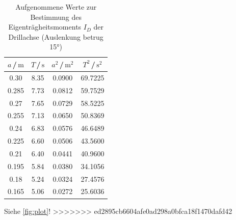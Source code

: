 \begin{table}[H]
\normalsize

\centering
{}
\begin{tabular}{c c c c}
\toprule
    $a$\,/\,$\si{\meter}$ &  $T$\,/\,$\si{\second}$ & $a^2$\,/\,$\si{\meter}^2$ &  $T^2$\,/\,$\si{\second}^2$ \\
    \midrule

0.30  &   8.35 &  0.0900      & 69.7225\\
0.285 &   7.73 &  0.0812  & 59.7529\\
0.27  &   7.65 &  0.0729    & 58.5225\\
0.255 &   7.13 &  0.0650  & 50.8369\\
0.24  &   6.83 &  0.0576    & 46.6489\\
0.225 &   6.60 &  0.0506  & 43.5600\\
0.21  &   6.40 &  0.0441    & 40.9600\\
0.195 &   5.84 &  0.0380  & 34.1056\\
0.18  &   5.24 &  0.0324    & 27.4576\\
0.165 &   5.06 &  0.0272  & 25.6036\\ 

    \bottomrule
\end{tabular}
\caption{Aufgenommene Werte zur Bestimmung des Eigenträgheitsmoments $I_{D}$ der Drillachse (Auslenkung betrug 15°)}
\label{tab:a2}
\end{table}




Siehe \autoref{fig:plot}!
>>>>>>> ed2895cb6604afe0ad298a0bfca18f1470dafd42
